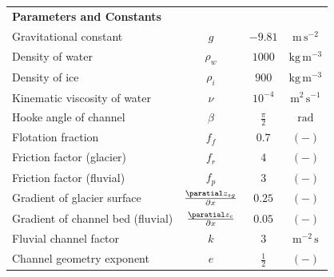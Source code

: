 \documentclass[11pt]{article}
\newcommand{\unit}[1]{$\mathrm{#1}$}
\begin{document}
\begin{spacing}{1}
\begin{table}[H]
\begin{tabular}{ l  c  c c }
              \textbf{Parameters and Constants}  & & &\\
              Gravitational constant&$g$& $-9.81$&$\mathrm{m\,s^{-2}}$\\
              Density of water & $\rho_w$& $1000$ & $\mathrm{kg\,m^{-3}}$ \\
              Density of ice & $\rho_i$& $900$ & $\mathrm{kg\,m^{-3}}$ \\
              Kinematic viscosity of water &$\nu$& $10^{-4}$& $\mathrm{m^2\,s^{-1}}$\\
              Hooke angle of channel & $\beta$ & $\frac{\pi}{2}$ & \unit{rad}\\
              Flotation fraction & $f_f$&$0.7$& $\mathrm{(-)}$\\
              Friction factor (glacier) & $f_r$ & $4$ & $\mathrm{(-)}$ \\
              Friction factor (fluvial) & $f_p$ & $3$ & $\mathrm{(-)}$\\
              Gradient of glacier surface & $\frac{\paratial z_{sg}}{\partial x}$ &$0.25$& $\mathrm{(-)}$\\
              Gradient of channel bed (fluvial) &$\frac{\paratial z_c}{\partial x}$ &$0.05$& $\mathrm{(-)}$\\
              Fluvial channel factor & $k$ &$3$ & $\mathrm{m^{-2}\, s}$\\
              Channel geometry exponent &$e$& $\frac{1}{2}$&$\mathrm{(-)}$ \\
              \hline
            \end{tabular}
            \label{table:vpm}
          \end{table}
        

\end{spacing}
\end{document}
